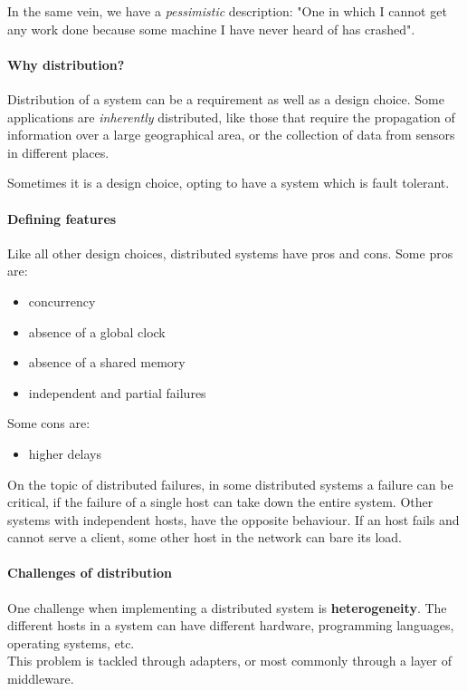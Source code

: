 \documentclass{article}
\begin{document}
In the same vein, we have a \textit{pessimistic} description: "One in which I cannot get any work done because some machine I have never heard of has crashed".

\paragraph{Why distribution?}
Distribution of a system can be a requirement as well as a design choice.
Some applications are \textit{inherently} distributed, like those that require the propagation of information over a large geographical area, or the collection of data from sensors in different places.

Sometimes it is a design choice, opting to have a system which is fault tolerant.

\paragraph{Defining features}
Like all other design choices, distributed systems have pros and cons. Some pros are:
\begin{itemize}
    \item concurrency 
    \item absence of a global clock 
    \item absence of a shared memory 
    \item independent and partial failures
\end{itemize}
Some cons are:
\begin{itemize}
    \item higher delays
\end{itemize}

On the topic of distributed failures, in some distributed systems a failure can be critical, if the failure of a single host can take down the entire system.
Other systems with independent hosts, have the opposite behaviour. If an host fails and cannot serve a client, some other host in the network can bare its load.

\paragraph{Challenges of distribution}
One challenge when implementing a distributed system is \textbf{heterogeneity}. The different hosts in a system can have different hardware, programming languages, operating systems, etc.\\
This problem is tackled through adapters, or most commonly through a layer of middleware.
\end{document}
